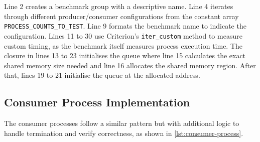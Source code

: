 Line 2 creates a benchmark group with a descriptive name. Line 4 iterates through different producer/consumer configurations from the constant array \texttt{PROCESS\_COUNTS\_TO\_TEST}. Line 9 formats the benchmark name to indicate the configuration. Lines 11 to 30 use Criterion's \texttt{iter\_custom} method to measure custom timing, as the benchmark itself measures process execution time. The closure in lines 13 to 23 initialises the queue where line 15 calculates the exact shared memory size needed and line 16 allocates the shared memory region. After that, lines 19 to 21 initialise the queue at the allocated address.

\subsection{Consumer Process Implementation}
The consumer processes follow a similar pattern but with additional logic to handle termination and verify correctness, as shown in \cref{lst:consumer-process}.

